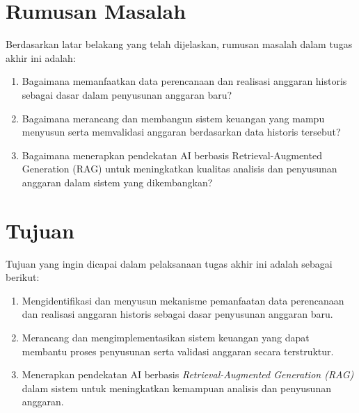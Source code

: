 \section{Rumusan Masalah}
Berdasarkan latar belakang yang telah dijelaskan, rumusan masalah dalam tugas akhir ini adalah:
\begin{enumerate}
\item	Bagaimana memanfaatkan data perencanaan dan realisasi anggaran historis sebagai dasar dalam penyusunan anggaran baru?
\item   Bagaimana merancang dan membangun sistem keuangan yang mampu menyusun serta memvalidasi anggaran berdasarkan data historis tersebut?
\item   Bagaimana menerapkan pendekatan AI berbasis Retrieval-Augmented Generation (RAG) untuk meningkatkan kualitas analisis dan penyusunan anggaran dalam sistem yang dikembangkan?
\end{enumerate}

\section{Tujuan}
Tujuan yang ingin dicapai dalam pelaksanaan tugas akhir ini adalah sebagai berikut:
\begin{enumerate}
\item   Mengidentifikasi dan menyusun mekanisme pemanfaatan data perencanaan dan realisasi anggaran historis sebagai dasar penyusunan anggaran baru.
\item   Merancang dan mengimplementasikan sistem keuangan yang dapat membantu proses penyusunan serta validasi anggaran secara terstruktur.
\item   Menerapkan pendekatan AI berbasis \textit{Retrieval-Augmented Generation (RAG)} dalam sistem untuk meningkatkan kemampuan analisis dan penyusunan anggaran.
\end{enumerate}

